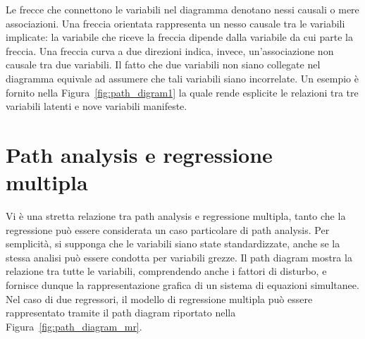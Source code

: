 Le frecce che connettono le variabili nel diagramma denotano nessi
causali o mere associazioni. 
 Una freccia orientata rappresenta un nesso causale tra
  le variabili implicate: la variabile che riceve la freccia dipende dalla variabile
da cui parte la freccia.
 Una freccia curva a due direzioni indica,
invece, un'associazione non causale tra due variabili.
Il fatto che due variabili non siano
collegate nel diagramma equivale ad assumere che tali variabili siano
incorrelate. 
Un esempio è fornito nella Figura~\ref{fig:path_digram1} la quale rende esplicite le relazioni tra tre variabili latenti e nove variabili manifeste. 

\section{Path analysis e regressione multipla}

Vi è una stretta relazione tra path analysis e regressione
multipla, tanto che la regressione può essere considerata un caso
particolare di path analysis.
 Per semplicità, si supponga che
le variabili siano state standardizzate, anche se la stessa analisi
può essere condotta per variabili grezze. 
Il path diagram mostra la relazione tra tutte le variabili, comprendendo anche
i fattori di disturbo, e fornisce dunque la rappresentazione grafica
di un sistema di equazioni simultanee.  
Nel caso di due regressori, il modello di regressione multipla può essere rappresentato tramite il path diagram riportato nella Figura~\ref{fig:path_diagram_mr}.

